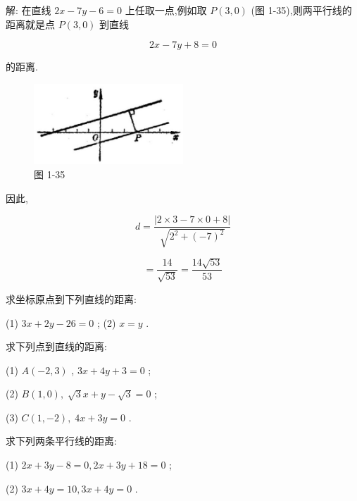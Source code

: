 \documentclass[lang=cn,newtx,10pt,scheme=chinese]{elegantbook}
\begin{document}
解: 在直线 \({2x} - {7y} - 6 = 0\) 上任取一点,例如取 \(P\left( {3,0}\right)\) (图 1-35),则两平行线的距离就是点 \(P\left( {3,0}\right)\) 到直线

\[
    {2x} - {7y} + 8 = 0
\]

的距离.

\begin{figure}[h]
  \centering
  \includegraphics[max width=0.5\textwidth]{images/01912cc2-ffb6-728e-9ae7-b113ff05c64b_56_427717.jpg}
  \caption{图 1-35}
\end{figure}



因此,

\[
  d = \frac{\left| 2 \times 3 - 7 \times 0 + 8\right| }{\sqrt{{2}^{2} + {\left( -7\right) }^{2}}}
\]

\[
  = \frac{14}{\sqrt{53}} = \frac{{14}\sqrt{53}}{53}
\]

\begin{problemset}[练习]

\item 求坐标原点到下列直线的距离:

(1) \({3x} + {2y} - {26} = 0\) ; (2) \(x = y\) .

\item 求下列点到直线的距离:

(1) \(A\left( {-2,3}\right)\) , \({3x} + {4y} + 3 = 0\) ;

(2) \(B\left( {1,0}\right) ,\;\sqrt{3}x + y - \sqrt{3} = 0\) ;

(3) \(C\left( {1, - 2}\right) ,\;{4x} + {3y} = 0\) .

\item 求下列两条平行线的距离:

(1) \({2x} + {3y} - 8 = 0,{2x} + {3y} + {18} = 0\) ;

(2) \({3x} + {4y} = {10},{3x} + {4y} = 0\) .

\end{problemset}
\end{document}
